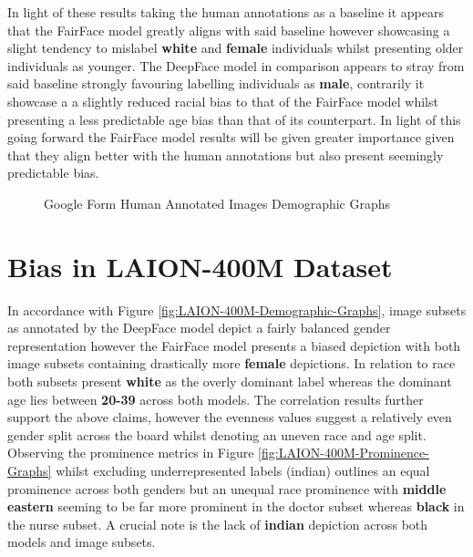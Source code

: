 In light of these results taking the human annotations as a baseline it appears that the FairFace model greatly aligns with said baseline however showcasing a slight tendency to mislabel \textbf{white} and \textbf{female} individuals whilst presenting older individuals as younger. The DeepFace model in comparison appears to stray from said baseline strongly favouring labelling individuals as \textbf{male}, contrarily it showcase a a slightly reduced racial bias to that of the FairFace model  whilst presenting a less predictable age bias than that of its counterpart. In light of this going forward the FairFace model results will be given greater importance given that they align better with the human annotations but also present seemingly predictable bias. 

\begin{figure}[H]
\centering  
{}
\caption{Google Form Human Annotated Images Demographic Graphs}\label{fig:Google-Form-Demographic-Graphs}
\end{figure}


\section{Bias in LAION-400M Dataset}\label{Eval-Laion400MBias}
In accordance with Figure \ref{fig:LAION-400M-Demographic-Graphs}, image subsets as annotated by the DeepFace model depict a fairly balanced gender representation however the FairFace model presents a biased depiction with both image subsets containing drastically more \textbf{female} depictions. In relation to race both subsets present \textbf{white} as the overly dominant label whereas the dominant age lies between \textbf{20-39} across both models. The correlation results further support the above claims, however the evenness values suggest a relatively even gender split across the board whilst denoting an uneven race and age split.  Observing the prominence metrics in Figure \ref{fig:LAION-400M-Prominence-Graphs} whilst excluding underrepresented labels (indian) outlines an equal prominence across both genders but an unequal race prominence with \textbf{middle eastern} seeming to be far more prominent in the doctor subset whereas \textbf{black} in the nurse subset. A crucial note is the lack of \textbf{indian} depiction across both models and image subsets.

